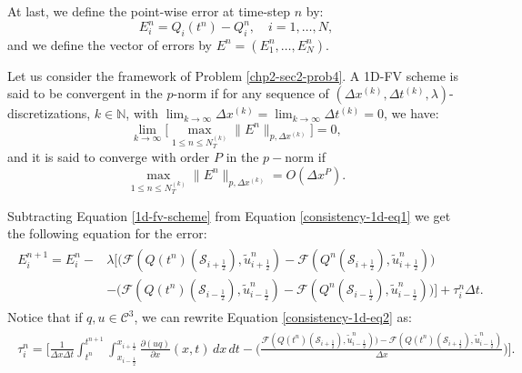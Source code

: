 At last, we define the point-wise error at time-step $n$ by:
\begin{equation*}
	E_i^n = Q_i(t^n) - Q_i^n, \quad i=1, \ldots, N,
\end{equation*}
and we define the vector of errors by $E^n = (E_1^n, \ldots, E_N^n)$. 
\begin{definition}[Convergence]
	\label{chp2-def-conv}
	Let us consider the framework of Problem \ref{chp2-sec2-prob4}.
	A 1D-FV scheme is said to be convergent in the $p$-norm if for any sequence of $(\Delta x^{(k)}, \Delta t^{(k)},\lambda)$-discretizations, 
	$k \in \mathbb{N}$, with $\lim_{k\to \infty }{\Delta x^{(k)}} = \lim_{k\to \infty }{\Delta t^{(k)}} = 0$, we have:
	\begin{equation*}
		\lim_{k\to \infty}\bigg[ {\max_{1\leq n\leq N_T^{(k)}}}{\|E^n\|_{p,\Delta x^{(k)}}} \bigg] = 0,
	\end{equation*}
	and it is said to converge with order $P$ in the $p-$norm if
	\begin{equation*}
		{\max_{1\leq n\leq N_T^{(k)}}}{\|E^n\|_{p,\Delta x^{(k)}}} = O(\Delta x^P).
	\end{equation*}
\end{definition}
Subtracting Equation \eqref{1d-fv-scheme} from Equation \eqref{consistency-1d-eq1} we get
the following equation for the error:
\begin{align}
	\begin{split}
		\label{erroreq-1d-eq2}
		E^{n+1}_i = E^n_i -
		&\lambda
		\bigg[
		\bigg( \mathcal{F}(Q(t^n)(\mathcal{S}_{i+\frac{1}{2}} ),\tilde{u}^n_{i+\frac{1}{2}}) - \mathcal{F}(Q^n(\mathcal{S}_{i+\frac{1}{2}} ),\tilde{u}^n_{i+\frac{1}{2}}) \bigg) \\
		&-\bigg( \mathcal{F}(Q(t^n)(\mathcal{S}_{i-\frac{1}{2}} ),\tilde{u}^n_{i-\frac{1}{2}}) - \mathcal{F}(Q^n(\mathcal{S}_{i-\frac{1}{2}} ),\tilde{u}^n_{i-\frac{1}{2}}) \bigg)
		\bigg] 
		+ \tau_{i}^n \Delta t .
	\end{split}
\end{align}
Notice that if $q,u \in \mathcal{C}^3$, we can rewrite Equation \ref{consistency-1d-eq2} as:
\begin{align*}
	\begin{split}
		\tau_{i}^n = 
		\bigg[ \frac{1}{\Delta x \Delta t}  \int_{t^{n}}^{t^{n+1}} \int_{x_{i-\frac{1}{2}}}^{x_{i+\frac{1}{2}}}
		{\frac{\partial (uq)}{\partial x}}(x, t) \,dx \,dt - 
		\bigg(\frac{\mathcal{F}(Q(t^n)(\mathcal{S}_{i+\frac{1}{2}} ),\tilde{u}^n_{i-\frac{1}{2}})) -\mathcal{F}(Q(t^n)(\mathcal{S}_{i+\frac{1}{2}} ),\tilde{u}^n_{i-\frac{1}{2}})}{\Delta x} \bigg)
		\bigg].
	\end{split}
\end{align*}
